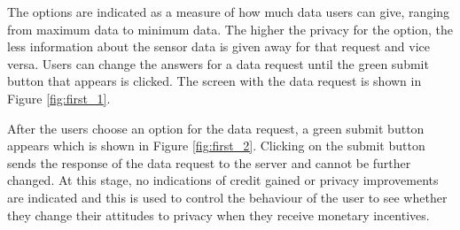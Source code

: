 The options are indicated as a measure of how much data users can give, ranging from maximum data to minimum data. The higher the privacy for the option, the less information about the sensor data is given away for that request and vice versa. Users can change the answers for a data request until the green submit button that appears is clicked. The screen with the data request is shown in Figure \ref{fig:first_1}. 

After the users choose an option for the data request, a green submit button appears which is shown in Figure \ref{fig:first_2}. Clicking on the submit button sends the response of the data request to the server and cannot be further changed. At this stage, no indications of credit gained or privacy improvements are indicated and this is used to control the behaviour of the user to see whether they change their attitudes to privacy when they receive monetary incentives.

